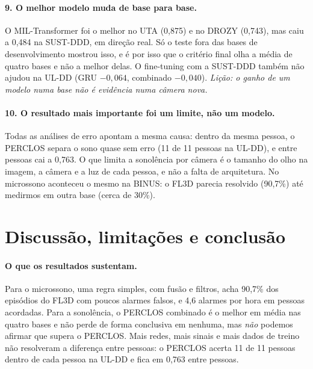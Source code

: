 \documentclass[11pt,a4paper]{article}
\begin{document}
\paragraph{9. O melhor modelo muda de base para base.} O MIL-Transformer foi o melhor no UTA (0,875) e no DROZY (0,743), mas caiu a 0,484 na SUST-DDD, em direção real. Só o teste fora das bases de desenvolvimento mostrou isso, e é por isso que o critério final olha a média de quatro bases e não a melhor delas. O fine-tuning com a SUST-DDD também não ajudou na UL-DD (GRU $-0{,}064$, combinado $-0{,}040$). \emph{Lição: o ganho de um modelo numa base não é evidência numa câmera nova.}

\paragraph{10. O resultado mais importante foi um limite, não um modelo.} Todas as análises de erro apontam a mesma causa: dentro da mesma pessoa, o PERCLOS separa o sono quase sem erro (11 de 11 pessoas na UL-DD), e entre pessoas cai a 0,763. O que limita a sonolência por câmera é o tamanho do olho na imagem, a câmera e a luz de cada pessoa, e não a falta de arquitetura. No microssono aconteceu o mesmo na BINUS: o FL3D parecia resolvido (90,7\%) até medirmos em outra base (cerca de 30\%).

\section{Discussão, limitações e conclusão}
\label{sec:disc}

\paragraph{O que os resultados sustentam.} Para o microssono, uma regra simples, com fusão e filtros, acha 90,7\% dos episódios do FL3D com poucos alarmes falsos, e 4,6 alarmes por hora em pessoas acordadas. Para a sonolência, o PERCLOS combinado é o melhor em média nas quatro bases e não perde de forma conclusiva em nenhuma, mas \emph{não} podemos afirmar que supera o PERCLOS. Mais redes, mais sinais e mais dados de treino não resolveram a diferença entre pessoas: o PERCLOS acerta 11 de 11 pessoas dentro de cada pessoa na UL-DD e fica em 0,763 entre pessoas.
\end{document}
